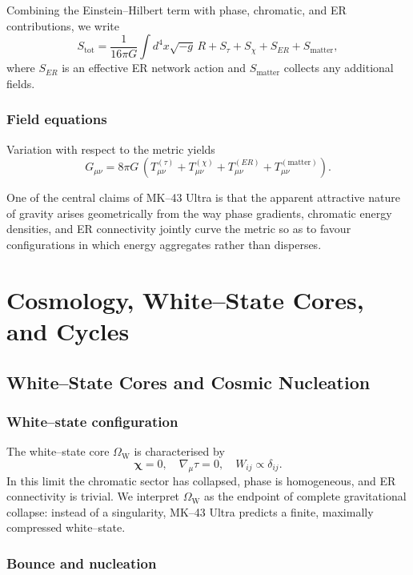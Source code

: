 \documentclass[11pt]{book}
\newcommand{\Wcore}{\Omega_{\mathrm{W}}}
\begin{document}
Combining the Einstein--Hilbert term with phase, chromatic, and ER contributions, we write
\begin{equation}
  S_{\mathrm{tot}} =
  \frac{1}{16\pi G}\int d^4x \sqrt{-g}\, R
  + S_\tau + S_\chi + S_{ER} + S_{\mathrm{matter}},
\end{equation}
where $S_{ER}$ is an effective ER network action and $S_{\mathrm{matter}}$ collects any additional fields.

\section{Field equations}

Variation with respect to the metric yields
\begin{equation}
  G_{\mu\nu}
  =
  8\pi G\, \left(
    T^{(\tau)}_{\mu\nu}
    + T^{(\chi)}_{\mu\nu}
    + T^{(ER)}_{\mu\nu}
    + T^{\mathrm{(matter)}}_{\mu\nu}
  \right).
\end{equation}

One of the central claims of MK--43 Ultra is that the apparent attractive nature of gravity arises geometrically from the way phase gradients, chromatic energy densities, and ER connectivity jointly curve the metric so as to favour configurations in which energy aggregates rather than disperses.

\part{Cosmology, White--State Cores, and Cycles}

\chapter{White--State Cores and Cosmic Nucleation}

\section{White--state configuration}

The white--state core $\Wcore$ is characterised by
\[
  \bm{\chi} = 0, \quad \nabla_\mu \tau = 0, \quad W_{ij} \propto \delta_{ij}.
\]
In this limit the chromatic sector has collapsed, phase is homogeneous, and ER connectivity is trivial.
We interpret $\Wcore$ as the endpoint of complete gravitational collapse: instead of a singularity, MK--43 Ultra predicts a finite, maximally compressed white--state.

\section{Bounce and nucleation}
\end{document}
